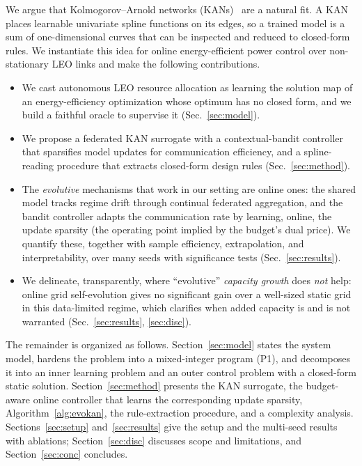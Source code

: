 \documentclass[journal]{IEEEtran}
\begin{document}
We argue that Kolmogorov--Arnold networks (KANs)~\cite{liu2024kan} are a natural
fit. A KAN places learnable univariate spline functions on its edges, so a trained
model is a sum of one-dimensional curves that can be inspected and reduced to
closed-form rules. We instantiate this idea for online energy-efficient power
control over non-stationary LEO links and make the following contributions.
\begin{itemize}
\item We cast autonomous LEO resource allocation as learning the solution map of
an energy-efficiency optimization whose optimum has no closed form, and we build a
faithful oracle to supervise it (Sec.~\ref{sec:model}).
\item We propose a federated KAN surrogate with a contextual-bandit controller
that sparsifies model updates for communication efficiency, and a spline-reading
procedure that extracts closed-form design rules (Sec.~\ref{sec:method}).
\item The \emph{evolutive} mechanisms that work in our setting are online ones: the
shared model tracks regime drift through continual federated aggregation, and the
bandit controller adapts the communication rate by learning, online, the update
sparsity (the operating point implied by the budget's dual price). We quantify these, together with sample efficiency, extrapolation, and
interpretability, over many seeds with significance tests (Sec.~\ref{sec:results}).
\item We delineate, transparently, where ``evolutive'' \emph{capacity growth} does
\emph{not} help: online grid self-evolution gives no significant gain over a
well-sized static grid in this data-limited regime, which clarifies when added
capacity is and is not warranted (Sec.~\ref{sec:results}, \ref{sec:disc}).
\end{itemize}

The remainder is organized as follows. Section~\ref{sec:model} states the system
model, hardens the problem into a mixed-integer program (P1), and decomposes it
into an inner learning problem and an outer control problem with a closed-form
static solution. Section~\ref{sec:method} presents the KAN surrogate, the
budget-aware online controller that learns the corresponding update sparsity,
Algorithm~\ref{alg:evokan}, the rule-extraction procedure, and a complexity
analysis. Sections~\ref{sec:setup} and~\ref{sec:results} give the setup and the
multi-seed results with ablations; Section~\ref{sec:disc} discusses scope and
limitations, and Section~\ref{sec:conc} concludes.
\end{document}
